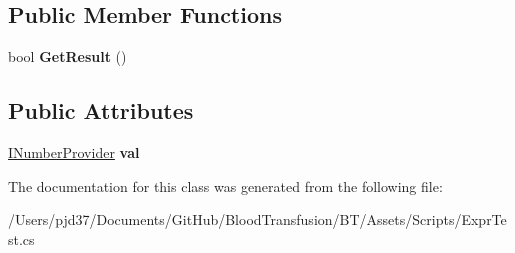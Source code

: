 \subsection*{Public Member Functions}
\begin{DoxyCompactItemize}
\item 
bool {\bfseries Get\+Result} ()\hypertarget{class_b83_1_1_logic_expression_parser_1_1_number_to_bool_a383ba3452cb94b0b1228a0ed6d07e264}{}\label{class_b83_1_1_logic_expression_parser_1_1_number_to_bool_a383ba3452cb94b0b1228a0ed6d07e264}

\end{DoxyCompactItemize}
\subsection*{Public Attributes}
\begin{DoxyCompactItemize}
\item 
\hyperlink{interface_b83_1_1_logic_expression_parser_1_1_i_number_provider}{I\+Number\+Provider} {\bfseries val}\hypertarget{class_b83_1_1_logic_expression_parser_1_1_number_to_bool_a65d62bd525f77763b948e037eb241915}{}\label{class_b83_1_1_logic_expression_parser_1_1_number_to_bool_a65d62bd525f77763b948e037eb241915}

\end{DoxyCompactItemize}


The documentation for this class was generated from the following file\+:\begin{DoxyCompactItemize}
\item 
/\+Users/pjd37/\+Documents/\+Git\+Hub/\+Blood\+Transfusion/\+B\+T/\+Assets/\+Scripts/Expr\+Test.\+cs\end{DoxyCompactItemize}
